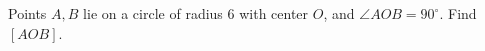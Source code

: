 Points $A,B$ lie on a circle of radius $6$ with center $O$, and $\angle AOB=90^\circ$. Find $[AOB]$.
